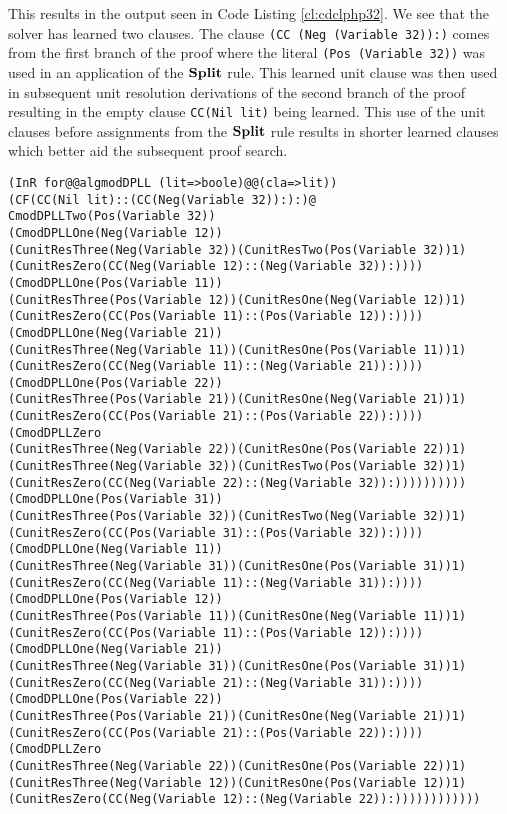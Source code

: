 This results in the output seen in Code Listing \ref{cl:cdclphp32}.  We see that the solver has learned two clauses. The clause \texttt{(CC (Neg (Variable 32)):)} comes from the first branch of the proof where the literal \texttt{(Pos (Variable 32))} was used in an application of the $\mathbf{Split}$ rule. This learned unit clause was then used in subsequent unit resolution derivations of the second branch of the proof resulting in the empty clause \texttt{CC(Nil lit)} being learned.  This use of the unit clauses before assignments from the $\mathbf{Split}$ rule results in shorter learned clauses which better aid the subsequent proof search.
\newpage
\begin{lstlisting}[caption = The Modified DPLL Proof that PHP(3\,2) is Unsatisfiable, label = cl:cdclphp32] 
(InR for@@algmodDPLL (lit=>boole)@@(cla=>lit))
(CF(CC(Nil lit)::(CC(Neg(Variable 32)):):)@
CmodDPLLTwo(Pos(Variable 32))
(CmodDPLLOne(Neg(Variable 12))
(CunitResThree(Neg(Variable 32))(CunitResTwo(Pos(Variable 32))1)
(CunitResZero(CC(Neg(Variable 12)::(Neg(Variable 32)):))))
(CmodDPLLOne(Pos(Variable 11))
(CunitResThree(Pos(Variable 12))(CunitResOne(Neg(Variable 12))1)
(CunitResZero(CC(Pos(Variable 11)::(Pos(Variable 12)):))))
(CmodDPLLOne(Neg(Variable 21))
(CunitResThree(Neg(Variable 11))(CunitResOne(Pos(Variable 11))1)
(CunitResZero(CC(Neg(Variable 11)::(Neg(Variable 21)):))))
(CmodDPLLOne(Pos(Variable 22))
(CunitResThree(Pos(Variable 21))(CunitResOne(Neg(Variable 21))1)
(CunitResZero(CC(Pos(Variable 21)::(Pos(Variable 22)):))))
(CmodDPLLZero
(CunitResThree(Neg(Variable 22))(CunitResOne(Pos(Variable 22))1)
(CunitResThree(Neg(Variable 32))(CunitResTwo(Pos(Variable 32))1)
(CunitResZero(CC(Neg(Variable 22)::(Neg(Variable 32)):))))))))))
(CmodDPLLOne(Pos(Variable 31))
(CunitResThree(Pos(Variable 32))(CunitResTwo(Neg(Variable 32))1)
(CunitResZero(CC(Pos(Variable 31)::(Pos(Variable 32)):))))
(CmodDPLLOne(Neg(Variable 11))
(CunitResThree(Neg(Variable 31))(CunitResOne(Pos(Variable 31))1)
(CunitResZero(CC(Neg(Variable 11)::(Neg(Variable 31)):))))
(CmodDPLLOne(Pos(Variable 12))
(CunitResThree(Pos(Variable 11))(CunitResOne(Neg(Variable 11))1)
(CunitResZero(CC(Pos(Variable 11)::(Pos(Variable 12)):))))
(CmodDPLLOne(Neg(Variable 21))
(CunitResThree(Neg(Variable 31))(CunitResOne(Pos(Variable 31))1)
(CunitResZero(CC(Neg(Variable 21)::(Neg(Variable 31)):))))
(CmodDPLLOne(Pos(Variable 22))
(CunitResThree(Pos(Variable 21))(CunitResOne(Neg(Variable 21))1)
(CunitResZero(CC(Pos(Variable 21)::(Pos(Variable 22)):))))
(CmodDPLLZero
(CunitResThree(Neg(Variable 22))(CunitResOne(Pos(Variable 22))1)
(CunitResThree(Neg(Variable 12))(CunitResOne(Pos(Variable 12))1)
(CunitResZero(CC(Neg(Variable 12)::(Neg(Variable 22)):))))))))))))
\end{lstlisting}



